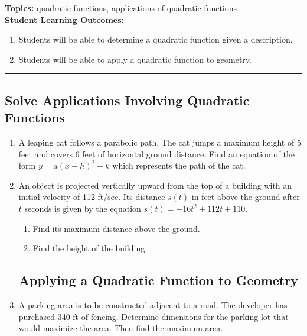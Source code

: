 

\noindent \textbf{Topics:}  quadratic functions, applications of quadratic functions\\

\noindent \textbf{Student Learning Outcomes:}
\begin{enumerate}
\item Students will be able to determine a quadratic function given a description.
\item Students will be able to apply a quadratic function to geometry.
\end{enumerate}

\hrule 

\bigskip

\subsection{Solve Applications Involving Quadratic Functions}


\begin{enumerate}
\item A leaping cat follows a parabolic path. The cat jumps a maximum height of 5 feet and covers 6 feet of horizontal ground distance. Find an equation of the form $y = a(x-h)^2+k$ which represents the path of the cat. \vfill

\item An object is projected vertically upward from the top of a building with an initial velocity of 112 ft/sec. Its distance $s(t)$ in feet above the ground after $t$ seconds is given by the equation $s(t)=-16t^2 + 112t + 110.$
\begin{enumerate}
\item Find its maximum distance above the ground.
\item Find the height of the building.
\end{enumerate}

\vfill



\newpage


\subsection{Applying a Quadratic Function to Geometry}


\item A parking area is to be constructed adjacent to a road.  The developer has purchased 340 ft of fencing.  Determine dimensions for the parking lot that would maximize the area.  Then find the maximum area.


\vfill



\end{enumerate}

